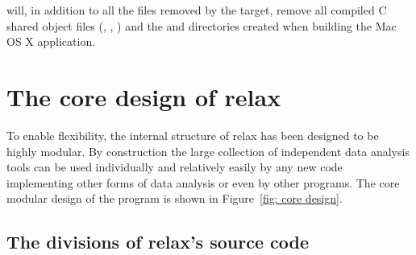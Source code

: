 will, in addition to all the files removed by the  target, remove all compiled C shared object files (, , ) and the  and  directories created when building the Mac OS X application.




\section{The core design of relax}

To enable flexibility, the internal structure of relax has been designed to be highly modular.
By construction the large collection of independent data analysis tools can be used individually and relatively easily by any new code implementing other forms of data analysis or even by other programs.
The core modular design of the program is shown in Figure~\ref{fig: core design}.



\subsection{The divisions of relax's source code}

